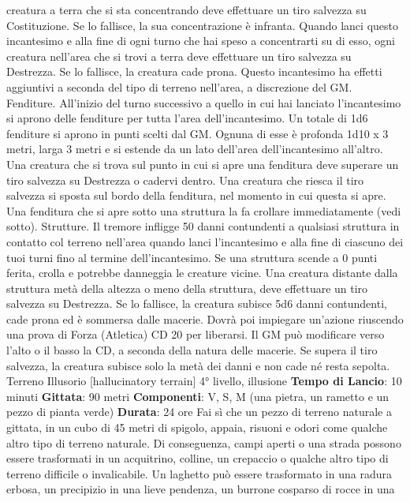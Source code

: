 \begin{multicols}{2}
creatura a terra che si sta concentrando deve effettuare
un tiro salvezza su Costituzione. Se lo fallisce, la sua
concentrazione è infranta.
Quando lanci questo incantesimo e alla fine di ogni
turno che hai speso a concentrarti su di esso, ogni
creatura nell’area che si trovi a terra deve effettuare un
tiro salvezza su Destrezza. Se lo fallisce, la creatura
cade prona.
Questo incantesimo ha effetti aggiuntivi a seconda del
tipo di terreno nell’area, a discrezione del GM.
Fenditure. All’inizio del turno successivo a quello in cui
hai lanciato l’incantesimo si aprono delle fenditure per
tutta l’area dell’incantesimo. Un totale di 1d6 fenditure si
aprono in punti scelti dal GM. Ognuna di esse è
profonda 1d10 x 3 metri, larga 3 metri e si estende da
un lato dell’area dell’incantesimo all’altro. Una creatura
che si trova sul punto in cui si apre una fenditura deve
superare un tiro salvezza su Destrezza o cadervi
dentro. Una creatura che riesca il tiro salvezza si sposta
sul bordo della fenditura, nel momento in cui questa si
apre.
Una fenditura che si apre sotto una struttura la fa
crollare immediatamente (vedi sotto).
Strutture. Il tremore infligge 50 danni contundenti a
qualsiasi struttura in contatto col terreno nell’area
quando lanci l’incantesimo e alla fine di ciascuno dei
tuoi turni fino al termine dell’incantesimo. Se una
struttura scende a 0 punti ferita, crolla e potrebbe
danneggia le creature vicine. Una creatura distante
dalla struttura metà della altezza o meno della struttura,
deve effettuare un tiro salvezza su Destrezza. Se lo
fallisce, la creatura subisce 5d6 danni contundenti,
cade prona ed è sommersa dalle macerie. Dovrà poi
impiegare un’azione riuscendo una prova di Forza
(Atletica) CD 20 per liberarsi. Il GM può modificare
verso l’alto o il basso la CD, a seconda della natura
delle macerie. Se supera il tiro salvezza, la creatura
subisce solo la metà dei danni e non cade né resta
sepolta.
Terreno Illusorio
[hallucinatory terrain]
4° livello, illusione
\textbf{Tempo di Lancio}: 10 minuti
\textbf{Gittata}: 90 metri
\textbf{Componenti}: V, S, M (una pietra, un rametto e un
pezzo di pianta verde)
\textbf{Durata}: 24 ore
Fai sì che un pezzo di terreno naturale a gittata, in un
cubo di 45 metri di spigolo, appaia, risuoni e odori come
qualche altro tipo di terreno naturale. Di conseguenza,
campi aperti o una strada possono essere trasformati in
un acquitrino, colline, un crepaccio o qualche altro tipo
di terreno difficile o invalicabile. Un laghetto può essere
trasformato in una radura erbosa, un precipizio in una
lieve pendenza, un burrone cosparso di rocce in una

\end{multicols}

